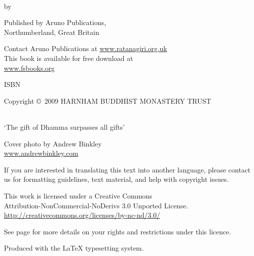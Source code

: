 \cleartoverso
\thispagestyle{empty}
{\copyrightsize\setlength{\parskip}{0.5\baselineskip}\setlength{\parindent}{0em}%
\raggedright%
\shaker\color[gray]{0.3}

\thetitle\\
by \theauthor

Published by Aruno Publications,\\
Northumberland, Great Britain

Contact Aruno Publications at \href{http://ratanagiri.org.uk/}{www.ratanagiri.org.uk}\\
This book is available for free download at\\
\href{http://fsbooks.org/}{www.fsbooks.org}

ISBN \theISBN

Copyright \copyright\ 2009 HARNHAM BUDDHIST MONASTERY TRUST

\\
`The gift of Dhamma surpasses all gifts'

Cover photo by Andrew Binkley\\
\href{http://andrewbinkley.com}{www.andrewbinkley.com}

{\tiny
If you are interested in translating this text into another language, please contact us for formatting guidelines, text material, and help with copyright issues.

This work is licensed under a Creative Commons\\
Attribution-NonCommercial-NoDerivs 3.0 Unported License.\\
\href{http://creativecommons.org/licenses/by-nc-nd/3.0/}{http://creativecommons.org/licenses/by-nc-nd/3.0/}

See page \pageref{copyright-details} for more details on your rights and restrictions under this licence.

Produced with the {\selectfont\LaTeX} typesetting system.


}}

